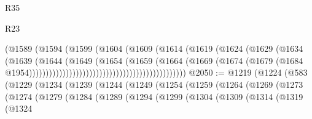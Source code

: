 \begin{lexlean}{R35}
\begin{lexlean}{R23}
\begin{coremodule}
{{{{{{{{{{{{{{{{{{{{{                                                          (@1589
                                                            (@1594
                                                              (@1599
                                                                (@1604
                                                                  (@1609
                                                                    (@1614
                                                                      (@1619
                                                                        (@1624
                                                                          (@1629
                                                                            (@1634
                                                                              (@1639
                                                                                (@1644
                                                                                  (@1649
                                                                                    (@1654
                                                                                      (@1659
                                                                                        (@1664
                                                                                          (@1669
                                                                                            (@1674
                                                                                              (@1679
                                                                                                (@1684
                                                                                                  @1954)))))))))))))))))))))))))))))))))))))))))))))))
@2050 := @1219
    (@1224
      (@583
        (@1229
          (@1234
            (@1239
              (@1244
                (@1249
                  (@1254
                    (@1259
                      (@1264
                        (@1269
                          (@1273
                            (@1274
                              (@1279
                                (@1284
                                  (@1289
                                    (@1294
                                      (@1299
                                        (@1304
                                          (@1309
                                            (@1314
                                              (@1319
                                                (@1324
}}}}}}}}}}}}}}}}}}}}}
\end{coremodule}
\end{lexlean}
\end{lexlean}
